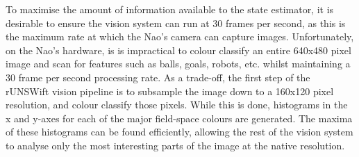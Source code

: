 \documentclass[pdftex,11pt,a4paper]{report}
\begin{document}
To maximise the amount of information available to the state estimator, it is
desirable to ensure the vision system can run at 30 frames per second, as this
is the maximum rate at which the Nao's camera can capture images. Unfortunately,
on the Nao's hardware, is is impractical to colour classify an entire 640x480
pixel image and scan for features such as balls, goals, robots, etc. whilst
maintaining a 30 frame per second processing rate. As a trade-off, the first
step of the rUNSWift vision pipeline is to subsample the image down to a 160x120
pixel resolution, and colour classify those pixels. While this is done,
histograms in the x and y-axes for each of the major field-space colours are
generated. The maxima of these histograms can be found efficiently, allowing
the rest of the vision system to analyse only the most interesting parts of the
image at the native resolution.
\end{document}
